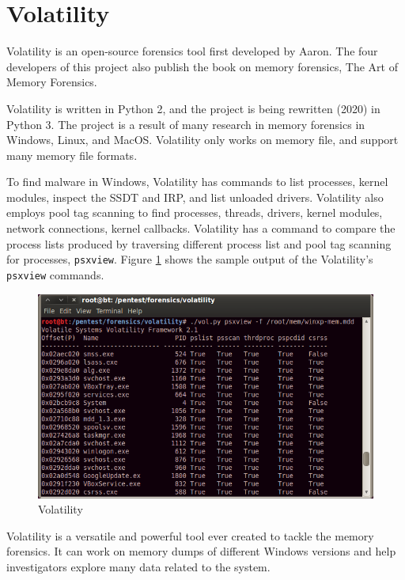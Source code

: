 \section[Volatility]{Volatility}

Volatility \cite{volatility} is an open-source forensics tool first developed
by Aaron. The four developers of this project also publish the book on memory
forensics, The Art of Memory Forensics.

Volatility is written in Python 2, and the project is being rewritten (2020) in
Python 3. The project is a result of many research in memory forensics in
Windows, Linux, and MacOS. Volatility only works on memory file, and support
many memory file formats.

To find malware in Windows, Volatility has commands to list processes, kernel
modules, inspect the SSDT and IRP, and list unloaded drivers. Volatility also
employs pool tag scanning to find processes, threads, drivers, kernel modules,
network connections, kernel callbacks. Volatility has a command to compare the
process lists produced by traversing different process list and pool tag
scanning for processes, \texttt{psxview}.  Figure \ref{fig:volatility} shows
the sample output of the Volatility's \texttt{psxview} commands.

\begin{figure}[h]
  \centering
  \caption{Volatility}
  \label{fig:volatility}
  \includegraphics[scale=0.5]{images/volatility.png}
\end{figure}

Volatility is a versatile and powerful tool ever created to tackle the memory
forensics. It can work on memory dumps of different Windows versions and help
investigators explore many data related to the system.
